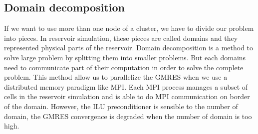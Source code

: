 \subsection{Domain decomposition}
If we want to use more than one node of a cluster, we have to divide our problem into pieces.
%
In reservoir simulation, these pieces are called domains and they represented physical parts of the reservoir.
%
Domain decomposition is a method to solve large problem by splitting them into smaller problems.
%
But each domains need to communicate part of their computation in order to solve the complete problem.
%
This method allow us to parallelize the GMRES when we use a distributed memory paradigm like MPI.
%
Each MPI process manages a subset of cells in the reservoir simulation and is able to do MPI communication on border of the domain.
%
However, the ILU preconditioner is sensible to the number of domain, the GMRES convergence is degraded when the number of domain is too high.
